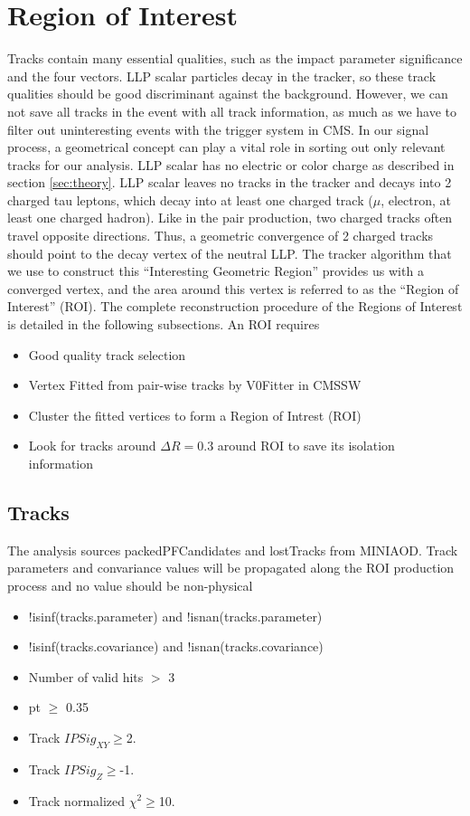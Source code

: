 \section{Region of Interest}\label{sec:ROIs}
Tracks contain many essential qualities, such as the impact parameter significance and the four vectors.
LLP scalar particles decay in the tracker, so these track qualities should be good discriminant against the background.
However, we can not save all tracks in the event with all track information, as much as we have to filter out uninteresting events with the trigger system in CMS.
In our signal process, a geometrical concept can play a vital role in sorting out only relevant tracks for our analysis.
LLP scalar has no electric or color charge as described in section \ref{sec:theory}.
LLP scalar leaves no tracks in the tracker and decays into 2 charged tau leptons, which decay into at least one charged track ($\mu$, electron, at least one charged hadron).
Like in the pair production, two charged tracks often travel opposite directions.
Thus, a geometric convergence of 2 charged tracks should point to the decay vertex of the neutral LLP.
The tracker algorithm that we use to construct this ``Interesting Geometric Region'' provides us with a converged vertex, and the area around this vertex is referred to as the ``Region of Interest'' (ROI).
The complete reconstruction procedure of the Regions of Interest is detailed in the following subsections.
An ROI requires
\begin{itemize}
  \item Good quality track selection
  \item Vertex Fitted from pair-wise tracks by V0Fitter in CMSSW
  \item Cluster the fitted vertices to form a Region of Intrest (ROI)
  \item Look for tracks around $\Delta R=0.3$ around ROI to save its isolation information
\end{itemize}

\subsection{Tracks}\label{sec:ROI_tracks}

The analysis sources packedPFCandidates and lostTracks from MINIAOD.
Track parameters and convariance values will be propagated along the ROI production process and no value should be non-physical
\begin{itemize}
  \item !isinf(tracks.parameter)  and !isnan(tracks.parameter) 
  \item !isinf(tracks.covariance) and !isnan(tracks.covariance) 
  \item Number of valid hits $>$ 3
  \item pt $\geq$ 0.35
  \item Track $IPSig_{XY}\geq$2.
  \item Track $IPSig_{Z}\geq$-1.
  \item Track normalized $\chi^{2}\geq$10.
\end{itemize}


